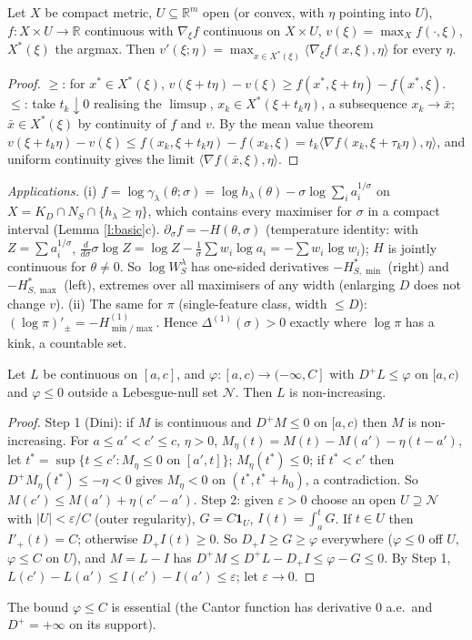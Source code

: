 \documentclass[11pt]{article}
\theoremstyle{remark}\newtheorem{remark}[theorem]{Remark}
\newcommand{\R}{\mathbb R}\newcommand{\E}{\mathbb E}
\begin{document}
\begin{lemma}\label{l:danskin}
Let $X$ be compact metric, $U\subseteq\R^m$ open (or convex, with $\eta$ pointing into $U$), $f:X\times U\to\R$ continuous with $\nabla_\xi f$ continuous on $X\times U$,
$v(\xi)=\max_Xf(\cdot,\xi)$, $X^*(\xi)$ the argmax. Then $v'(\xi;\eta)=\max_{x\in X^*(\xi)}\langle\nabla_\xi f(x,\xi),\eta\rangle$
for every $\eta$.
\end{lemma}
\begin{proof}
$\ge$: for $x^*\in X^*(\xi)$, $v(\xi+t\eta)-v(\xi)\ge f(x^*,\xi+t\eta)-f(x^*,\xi)$. $\le$: take $t_k\downarrow0$ realising the
$\limsup$, $x_k\in X^*(\xi+t_k\eta)$, a subsequence $x_k\to\bar x$; $\bar x\in X^*(\xi)$ by continuity of $f$ and $v$.
By the mean value theorem $v(\xi+t_k\eta)-v(\xi)\le f(x_k,\xi+t_k\eta)-f(x_k,\xi)=t_k\langle\nabla f(x_k,\xi+\tau_k\eta),\eta\rangle$,
and uniform continuity gives the limit $\langle\nabla f(\bar x,\xi),\eta\rangle$.
\end{proof}
\noindent\emph{Applications.} (i) $f=\log\gamma_\lambda(\theta;\sigma)=\log h_\lambda(\theta)-\sigma\log\sum_ia_i^{1/\sigma}$ on
$X=K_D\cap N_S\cap\{h_\lambda\ge\eta\}$, which contains every maximiser for $\sigma$ in a compact interval (Lemma \ref{l:basic}c).
$\partial_\sigma f=-H(\theta,\sigma)$ (temperature identity: with $Z=\sum a_i^{1/\sigma}$, $\frac{d}{d\sigma}\sigma\log Z=
\log Z-\frac1\sigma\sum w_i\log a_i=-\sum w_i\log w_i$); $H$ is jointly continuous for $\theta\ne0$.
So $\log W^\lambda_S$ has one-sided derivatives $-H^*_{S,\min}$ (right) and $-H^*_{S,\max}$ (left), extremes over all
maximisers of any width (enlarging $D$ does not change $v$). (ii) The same for $\pi$ (single-feature class, width $\le D$):
$(\log\pi)'_\pm=-H^{(1)}_{\min/\max}$. Hence $\Delta^{(1)}(\sigma)>0$ exactly where $\log\pi$ has a kink, a countable set.

\begin{lemma}\label{l:dini}
Let $L$ be continuous on $[a,c]$, and $\varphi:[a,c)\to(-\infty,C]$ with $D^+L\le\varphi$ on $[a,c)$ and $\varphi\le0$
outside a Lebesgue-null set $\mathcal N$. Then $L$ is non-increasing.
\end{lemma}
\begin{proof}
Step 1 (Dini): if $M$ is continuous and $D^+M\le0$ on $[a,c)$ then $M$ is non-increasing. For $a\le a'<c'\le c$, $\eta>0$,
$M_\eta(t)=M(t)-M(a')-\eta(t-a')$, let $t^*=\sup\{t\le c':M_\eta\le0\text{ on }[a',t]\}$; $M_\eta(t^*)\le0$; if $t^*<c'$ then
$D^+M_\eta(t^*)\le-\eta<0$ gives $M_\eta<0$ on $(t^*,t^*+h_0)$, a contradiction. So $M(c')\le M(a')+\eta(c'-a')$.
Step 2: given $\varepsilon>0$ choose an open $U\supseteq\mathcal N$ with $|U|<\varepsilon/C$ (outer regularity),
$G=C\mathbf 1_U$, $I(t)=\int_a^tG$. If $t\in U$ then $I'_+(t)=C$; otherwise $D_+I(t)\ge0$. So $D_+I\ge G\ge\varphi$
everywhere ($\varphi\le0$ off $U$, $\varphi\le C$ on $U$), and $M=L-I$ has $D^+M\le D^+L-D_+I\le\varphi-G\le0$.
By Step 1, $L(c')-L(a')\le I(c')-I(a')\le\varepsilon$; let $\varepsilon\to0$.
\end{proof}
\noindent The bound $\varphi\le C$ is essential (the Cantor function has derivative $0$ a.e.\ and $D^+=+\infty$ on its support).
\end{document}
